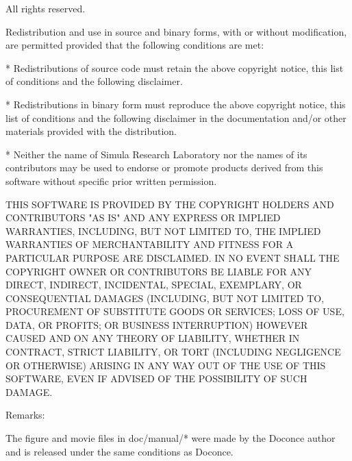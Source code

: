 \documentclass[%
oneside,                 %
final,                   %
chapterprefix=true,      %
open=right,              %
10pt]{book}
\begin{document}
All rights reserved.

Redistribution and use in source and binary forms, with or without
modification, are permitted provided that the following conditions are
met:

    * Redistributions of source code must retain the above copyright
      notice, this list of conditions and the following disclaimer.

    * Redistributions in binary form must reproduce the above copyright
      notice, this list of conditions and the following disclaimer in
      the documentation and/or other materials provided with the
      distribution.

    * Neither the name of Simula Research Laboratory nor the names of
      its contributors may be used to endorse or promote products
      derived from this software without specific prior written
      permission.

THIS SOFTWARE IS PROVIDED BY THE COPYRIGHT HOLDERS AND CONTRIBUTORS
"AS IS" AND ANY EXPRESS OR IMPLIED WARRANTIES, INCLUDING, BUT NOT
LIMITED TO, THE IMPLIED WARRANTIES OF MERCHANTABILITY AND FITNESS FOR
A PARTICULAR PURPOSE ARE DISCLAIMED. IN NO EVENT SHALL THE COPYRIGHT
OWNER OR CONTRIBUTORS BE LIABLE FOR ANY DIRECT, INDIRECT, INCIDENTAL,
SPECIAL, EXEMPLARY, OR CONSEQUENTIAL DAMAGES (INCLUDING, BUT NOT LIMITED
TO, PROCUREMENT OF SUBSTITUTE GOODS OR SERVICES; LOSS OF USE, DATA, OR
PROFITS; OR BUSINESS INTERRUPTION) HOWEVER CAUSED AND ON ANY THEORY OF
LIABILITY, WHETHER IN CONTRACT, STRICT LIABILITY, OR TORT (INCLUDING
NEGLIGENCE OR OTHERWISE) ARISING IN ANY WAY OUT OF THE USE OF THIS
SOFTWARE, EVEN IF ADVISED OF THE POSSIBILITY OF SUCH DAMAGE.

Remarks:

The figure and movie files in doc/manual/* were made by the Doconce
author and is released under the same conditions as Doconce.


\epyout


\end{document}
